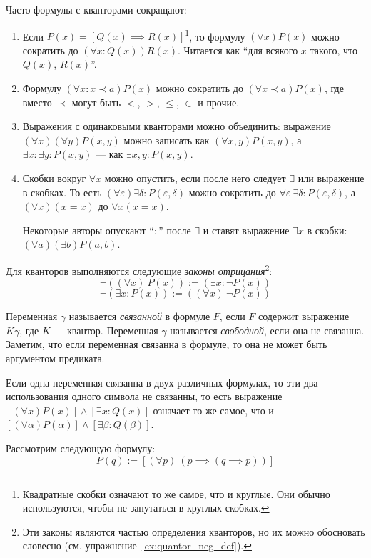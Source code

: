 Часто формулы с кванторами сокращают:
\begin{enumerate}
	\item{}Если ${P(x)=[Q(x)\implies R(x)]}$\footnote{Квадратные скобки означают то же самое,
		что и круглые. Они обычно используются, чтобы не запутаться в круглых скобках.},
	то формулу ${(\forall x)P(x)}$ можно сократить
	до ${(\forall x:Q(x))R(x)}$. Читается как ``для всякого $x$ такого, что
	$Q(x)$, $R(x)$''.
	\item{}Формулу $(\forall x:x\prec a)P(x)$ можно сократить до $(\forall x\prec a)P(x)$,
	где вместо $\prec$ могут быть $<$, $>$, $\leq$, $\in$ и прочие.
	\item{}Выражения с одинаковыми кванторами можно объединить:
	выражение $(\forall x)(\forall y)P(x,y)$ можно записать как $(\forall x,y)P(x,y)$,
	а $\exists x:\exists y:P(x,y)$ --- как $\exists x,y:P(x,y)$.
	\item{}Скобки вокруг $\forall x$ можно опустить, если после него следует $\exists$ или
	выражение в скобках.
	То есть ${(\forall \varepsilon)\exists \delta:P(\varepsilon,\delta)}$
	можно сократить до $\forall \varepsilon~\exists \delta:P(\varepsilon,\delta)$,
	а $(\forall x)(x=x)$ до $\forall x(x=x)$.

	Некоторые авторы опускают ``$:$'' после $\exists$ и ставят выражение $\exists x$ в
	скобки: $(\forall a)(\exists b)P(a,b)$.
\end{enumerate}

Для кванторов выполняются следующие {\it законы отрицания}\footnote{Эти законы являются
	частью определения
	кванторов, но их можно обосновать словесно (см. упражнение~\ref{ex:quantor_neg_def}).}:
\[
	\lnot((\forall x)~P(x)):=(\exists x:\lnot P(x))
\]
\[
	\lnot(\exists x:P(x)):=((\forall x)~\lnot P(x))
\]

Переменная $\gamma$ называется {\it связанной} в формуле $F$, если $F$
содержит выражение $K\gamma$, где $K$ --- квантор.
Переменная $\gamma$ называется {\it свободной}, если она не связанна.
Заметим, что если переменная связанна в формуле, то она не может быть
аргументом предиката.

Если одна переменная связанна в двух различных формулах,
то эти два использования одного символа не связанны, то есть
выражение ${[(\forall x)P(x)]\land[\exists x:Q(x)]}$ означает то же самое, что
и $[(\forall \alpha)P(\alpha)]\land[\exists \beta:Q(\beta)]$.

\pagebreak

Рассмотрим следующую формулу:
\[
	P(q):=[(\forall p)~(p\implies (q\implies p))]
\]

